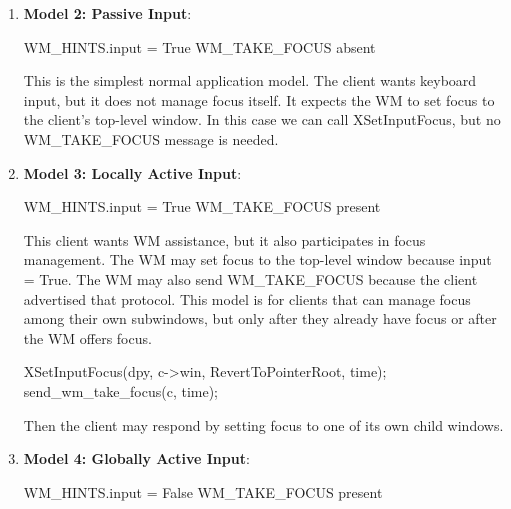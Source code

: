 \documentclass{report}
\begin{document}
\begin{itemize}
\begin{enumerate}
                    This client never wants keyboard input. The WM should not call XSetInputFocus, the WM also does not send WM\_TAKE\_FOCUS
                \item \textbf{Model 2: Passive Input}: 
                    \bigbreak \noindent 
                    \begin{cppcode}
                        WM_HINTS.input = True
                        WM_TAKE_FOCUS absent
                    \end{cppcode}
                    \bigbreak \noindent 
                    This is the simplest normal application model. The client wants keyboard input, but it does not manage focus itself. It expects the WM to set focus to the client’s top-level window.
                    \bigbreak \noindent 
                    In this case we can call XSetInputFocus, but no WM\_TAKE\_FOCUS message is needed.
                \item \textbf{Model 3: Locally Active Input}: 
                    \begin{cppcode}
                        WM_HINTS.input = True
                        WM_TAKE_FOCUS present
                    \end{cppcode}
                    \bigbreak \noindent 
                    This client wants WM assistance, but it also participates in focus management.
                    \bigbreak \noindent 
                    The WM may set focus to the top-level window because input = True. The WM may also send WM\_TAKE\_FOCUS because the client advertised that protocol.
                    \bigbreak \noindent 
                    This model is for clients that can manage focus among their own subwindows, but only after they already have focus or after the WM offers focus.
                    \bigbreak \noindent 
                    \begin{cppcode}
                        XSetInputFocus(dpy, c->win, RevertToPointerRoot, time);
                        send_wm_take_focus(c, time);
                    \end{cppcode}
                    \bigbreak \noindent 
                    Then the client may respond by setting focus to one of its own child windows.
                \item \textbf{Model 4: Globally Active Input}: 
                    \bigbreak \noindent 
                    \begin{cppcode}
                        WM_HINTS.input = False
                        WM_TAKE_FOCUS present
                    \end{cppcode}

\end{enumerate}
\end{itemize}
\end{document}
